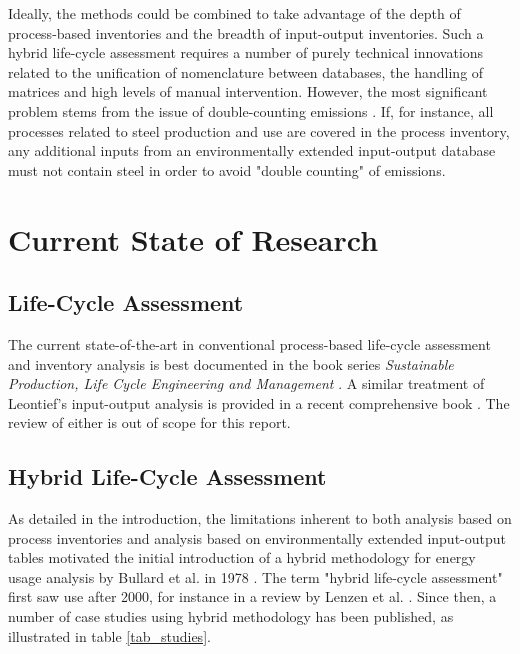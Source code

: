 \documentclass{article}
\begin{document}
    Ideally, the methods could be combined to take advantage of the depth of process-based inventories and the breadth of input-output inventories. Such a hybrid life-cycle assessment requires a number of purely technical innovations related to the unification of nomenclature between databases, the handling of matrices and high levels of manual intervention. However, the most significant problem stems from the issue of double-counting emissions \cite{agez_hybridization_2020}. If, for instance, all processes related to steel production and use are covered in the process inventory, any additional inputs from an environmentally extended input-output database must not contain steel in order to avoid "double counting" of emissions.
    
\section{Current State of Research}
\label{sec:current_state_of_research}

    
    \subsection{Life-Cycle Assessment}
    
        The current state-of-the-art in conventional process-based life-cycle assessment and inventory analysis is best documented in the book series \textit{Sustainable Production, Life Cycle Engineering and Management} \cite{teuteberg_progress_2019}\cite{albrecht_progress_2021}. A similar treatment of Leontief's input-output analysis is provided in a recent comprehensive book \cite{miller_input-output_2022}. The review of either is out of scope for this report.

    \subsection{Hybrid Life-Cycle Assessment}
        
        As detailed in the introduction, the limitations inherent to both analysis based on process inventories and analysis based on environmentally extended input-output tables motivated the initial introduction of a hybrid methodology for energy usage analysis by Bullard et al. in 1978 \cite{bullard_net_1978}. The term "hybrid life-cycle assessment" first saw use after 2000, for instance in a review by Lenzen et al. \cite{lenzen_errors_2000}. Since then, a number of case studies using hybrid methodology has been published, as illustrated in table \ref{tab_studies}.
        
\end{document}

